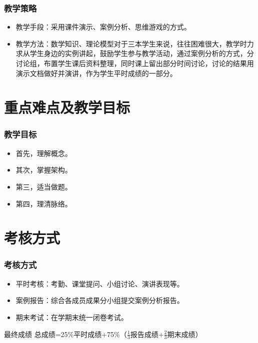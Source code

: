 \documentclass{beamer}
\begin{document}
\begin{frame}
\frametitle{教学策略}

\begin{itemize}
\item 教学手段：采用课件演示、案例分析、思维游戏的方式。
\item 教学方法：数学知识、理论模型对于三本学生来说，往往困难很大，教学时力求从学生身边的实例讲起，鼓励学生参与教学活动，通过案例分析的方式，分讨论组，布置学生课后资料整理，同时课上留出部分时间讨论，讨论的结果用演示文档做好并演讲，作为学生平时成绩的一部分。
\end{itemize}
\end{frame}



\section{重点难点及教学目标}


\begin{frame}
\frametitle{教学目标}

\begin{itemize}
\item 首先，理解概念。
\item 其次，掌握架构。
\item 第三，适当做题。
\item 第四，理清脉络。
\end{itemize}

\end{frame}




\section{考核方式}

\begin{frame}
\frametitle{考核方式}

\begin{itemize}
\item 平时考核：考勤、课堂提问、小组讨论、演讲表现等。
\item 案例报告：综合各成员成果分小组提交案例分析报告。
\item 期末考试：在学期末统一闭卷考试。
\end{itemize}

\begin{block}{最终成绩}
总成绩=25\%平时成绩+75\%（$\frac{1}{3}$报告成绩+$\frac{2}{3}$期末成绩）
\end{block}

\end{frame}
\end{document}
